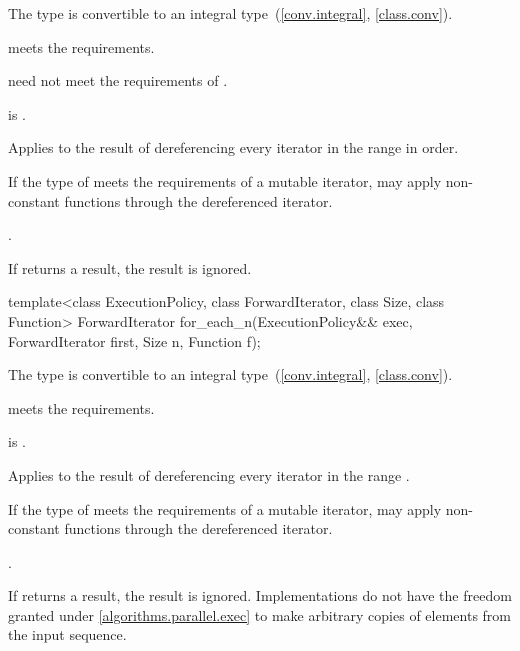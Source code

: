 \begin{itemdescr}
\pnum
\mandates
The type  is convertible
to an integral type~(\ref{conv.integral}, \ref{class.conv}).

\pnum
\expects
{} meets the  requirements.
\begin{note}
 need not meet
the requirements of .
\end{note}

\pnum
\expects
{} is .

\pnum
\effects
Applies  to the result of dereferencing
every iterator in the range  in order.
\begin{note}
If the type of  meets the requirements of a mutable iterator,
 may apply non-constant functions through the dereferenced iterator.
\end{note}

\pnum
\returns
{}.

\pnum
\remarks
If  returns a result, the result is ignored.
\end{itemdescr}

%
\begin{itemdecl}
template<class ExecutionPolicy, class ForwardIterator, class Size, class Function>
  ForwardIterator for_each_n(ExecutionPolicy&& exec, ForwardIterator first, Size n,
                             Function f);
\end{itemdecl}

\begin{itemdescr}
\pnum
\mandates
The type  is convertible
to an integral type~(\ref{conv.integral}, \ref{class.conv}).

\pnum
\expects
{} meets the  requirements.

\pnum
\expects
{} is .

\pnum
\effects
Applies  to the result of dereferencing
every iterator in the range .
\begin{note}
If the type of  meets the requirements of a mutable iterator,
 may apply non-constant functions through the dereferenced iterator.
\end{note}

\pnum
\returns
{}.

\pnum
\remarks
If  returns a result, the result is ignored.
Implementations do not have
the freedom granted under \ref{algorithms.parallel.exec}
to make arbitrary copies of elements from the input sequence.
\end{itemdescr}

